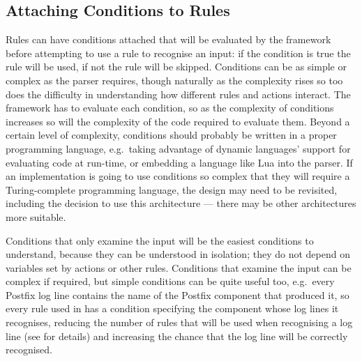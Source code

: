\subsection{Attaching Conditions to Rules}

\label{attaching conditions to rules}

\label{rule conditions in architecture}

Rules can have conditions attached that will be evaluated by the framework
before attempting to use a rule to recognise an input: if the condition is
true the rule will be used, if not the rule will be skipped.  Conditions
can be as simple or complex as the parser requires, though naturally as the
complexity rises so too does the difficulty in understanding how different
rules and actions interact.  The framework has to evaluate each condition,
so as the complexity of conditions increases so will the complexity of the
code required to evaluate them.  Beyond a certain level of complexity,
conditions should probably be written in a proper programming language,
e.g.\ taking advantage of dynamic languages' support for evaluating code at
run-time, or embedding a language like Lua into the parser.  If an
implementation is going to use conditions so complex that they will require
a Turing-complete programming language, the design may need to be
revisited, including the decision to use this architecture --- there may be
other architectures more suitable.

Conditions that only examine the input will be the easiest conditions to
understand, because they can be understood in isolation; they do not depend
on variables set by actions or other rules.  Conditions that examine the
input can be complex if required, but simple conditions can be quite useful
too, e.g.\ every Postfix log line contains the name of the Postfix
component that produced it, so every rule used in \parsername{} has a
condition specifying the component whose log lines it recognises, reducing
the number of rules that will be used when recognising a log line (see
 for details) and increasing
the chance that the log line will be correctly recognised.

